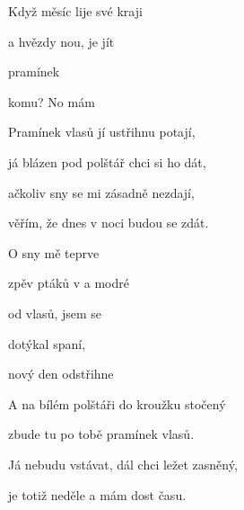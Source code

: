 

   

\zs
Když měsíc lije  své  kraji

a hvězdy nou,  je jít  

pramínek    

komu? No   mám  
\ks

\zs
Pramínek vlasů jí ustřihnu potají,

já blázen pod polštář chci si ho dát,

ačkoliv sny se mi zásadně nezdají,

věřím, že dnes v noci budou se zdát.
\ks

\zr
O sny mě  teprve 

zpěv ptáků v  a modré 

od vlasů,  jsem se

dotýkal  spaní,

nový den  odstřihne 
\kr

\zs
A na bílém polštáři do kroužku stočený

zbude tu po tobě pramínek vlasů.

Já nebudu vstávat, dál chci ležet zasněný,

je totiž neděle a mám dost času.
\ks

\zr \kr

\kp


















